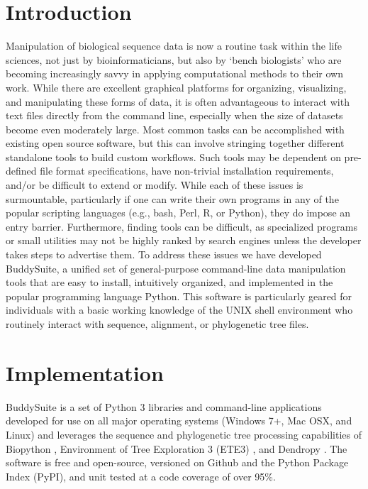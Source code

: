 \documentclass[nogrid]{MBE_article}%
\begin{document}
\section{{Introduction}\label{sec:Intro}}
Manipulation of biological sequence data is now a routine task within the life sciences, not just by bioinformaticians, but also by `bench biologists' who are becoming increasingly savvy in applying computational methods to their own work. While there are excellent graphical platforms for organizing, visualizing, and manipulating these forms of data, it is often advantageous to interact with text files directly from the command line, especially when the size of datasets become even moderately large. Most common tasks can be accomplished with existing open source software, but this can involve stringing together different standalone tools to build custom workflows. Such tools may be dependent on pre-defined file format specifications, have non-trivial installation requirements, and/or be difficult to extend or modify. While each of these issues is surmountable, particularly if one can write their own programs in any of the popular scripting languages (e.g., bash, Perl, R, or Python), they do impose an entry barrier. Furthermore, finding tools can be difficult, as specialized programs or small utilities may not be highly ranked by search engines unless the developer takes steps to advertise them. To address these issues we have developed BuddySuite, a unified set of general-purpose command-line data manipulation tools that are easy to install, intuitively organized, and implemented in the popular programming language Python. This software is particularly geared for individuals with a basic working knowledge of the UNIX shell environment who routinely interact with sequence, alignment, or phylogenetic tree files.

\section{Implementation}
BuddySuite is a set of Python 3 libraries and command-line applications developed for use on all major operating systems (Windows 7+, Mac OSX, and Linux) and leverages the sequence and phylogenetic tree processing capabilities of Biopython \cite{Cock:2009hj}, Environment of Tree Exploration 3 (ETE3) \cite{HuertaCepas:2016hw}, and Dendropy \cite{Sukumaran:2010id}. The software is free and open-source, versioned on Github \cite{github} and the Python Package Index \cite{pypi} (PyPI), and unit tested at a code coverage of over 95\%.
\end{document}
